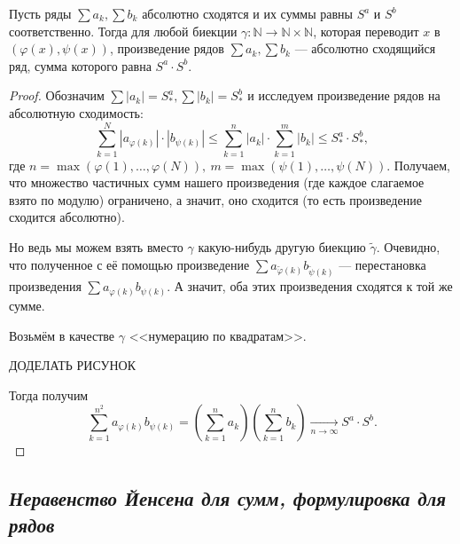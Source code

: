 \begin{theorem}
	Пусть ряды \(\sum a_k, \sum b_k\) абсолютно сходятся и их суммы равны \(S^a\) и \(S^b\) соответственно. Тогда для любой биекции \(\gamma \colon \mathbb{N} \to \mathbb{N} \times \mathbb{N}\), которая переводит \(x\) в \((\varphi(x), \psi(x))\), произведение рядов \(\sum a_k, \sum b_k\) --- абсолютно сходящийся ряд, сумма которого равна \(S^a \cdot S^b\).
\end{theorem}
\begin{proof}
	Обозначим \(\sum |a_k| = S_*^a, \sum |b_k| = S_*^b\) и исследуем произведение рядов на абсолютную сходимость: \[
		\sum_{k=1}^{N} |a_{\varphi(k)}| \cdot |b_{\psi(k)}| \leqslant \sum_{k=1}^{n} |a_k| \cdot \sum_{k=1}^{m} |b_k| \leqslant S_*^a \cdot S_*^b,
	\]
	где \(n = \max(\varphi(1), \ldots, \varphi(N)), \ m = \max(\psi(1), \ldots, \psi(N))\). Получаем, что множество частичных сумм нашего произведения (где каждое слагаемое взято по модулю) ограничено, а значит, оно сходится (то есть произведение сходится абсолютно).
	
	Но ведь мы можем взять вместо \(\gamma\) какую-нибудь другую биекцию \(\widetilde{\gamma}\). Очевидно, что полученное с её помощью произведение \(\sum a_{\widetilde{\varphi}(k)} b_{\widetilde{\psi}(k)}\) --- перестановка произведения \(\sum a_{\varphi(k)} b_{\psi(k)}\). А значит, оба этих произведения сходятся к той же сумме.
	
	Возьмём в качестве \(\gamma\) <<нумерацию по квадратам>>.
	
	ДОДЕЛАТЬ РИСУНОК
	
	Тогда получим \[
		\sum_{k=1}^{n^2} a_{\varphi(k)} b_{\psi(k)} = \left(\sum_{k=1}^n a_k \right) \left(\sum_{k=1}^n b_k \right) \xrightarrow[n \to \infty]{} S^a \cdot S^b.
	\]
\end{proof}

\subsection{\itshape Неравенство Йенсена для сумм, формулировка для рядов}

